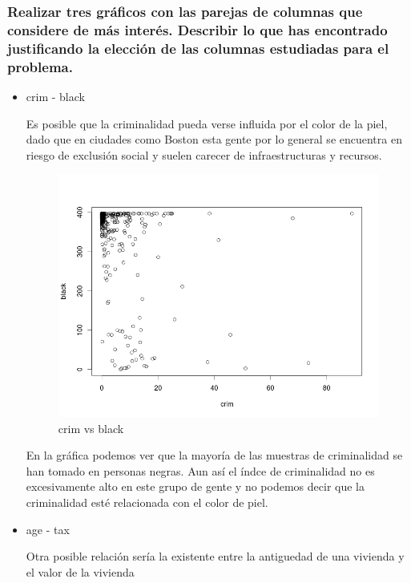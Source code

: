 \subsubsection{Realizar tres gráficos con las parejas de columnas que considere de más interés. Describir lo que has encontrado justificando la elección de las columnas estudiadas para el problema.}

\begin{itemize}

\item crim - black

Es posible que la criminalidad pueda verse influida por el color de la piel, dado que en ciudades como Boston esta gente por lo general se encuentra en riesgo de exclusión social y suelen carecer de infraestructuras y recursos.

\begin{figure}[H]
\centering
\includegraphics[scale=0.50]{cromblack.png}
\caption{crim vs black}
\label{}
\end{figure}

En la gráfica podemos ver que la mayoría de las muestras de criminalidad se han tomado en personas negras. Aun así el índce de criminalidad no es excesivamente alto en este grupo de gente y no podemos decir que la criminalidad esté relacionada con el color de piel.

\item age - tax

Otra posible relación sería la existente entre la antiguedad de una vivienda y el valor de la vivienda


\end{itemize}
